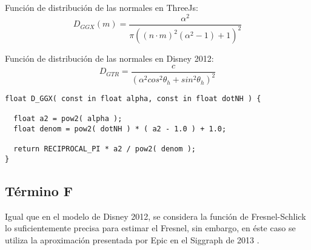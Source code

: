   Funci\'on de distribuci\'on de las normales en ThreeJs:\\

  \begin{equation}
    D_{GGX}(m) = \frac{\alpha^2}{\pi((n\cdotp{m})^2(\alpha^2 - 1 ) + 1)^2}
  \end{equation}
  \singlespacing

  Funci\'on de distribuci\'on de las normales en Disney 2012:\\

  \begin{equation}
    D_{GTR} = \frac
    {c}
    {(\alpha^2 cos^2 \theta_h + sin^2 \theta_h)^2}
  \end{equation}
  \singlespacing

  \begin{lstlisting}[caption=Implementaci\'on en ThreeJs del t\'ermino de geometr\'ia]
float D_GGX( const in float alpha, const in float dotNH ) {

  float a2 = pow2( alpha );
  float denom = pow2( dotNH ) * ( a2 - 1.0 ) + 1.0;

  return RECIPROCAL_PI * a2 / pow2( denom );
}
  \end{lstlisting}
  \singlespacing

  \subsection*{T\'ermino F}
  Igual que en el modelo de Disney 2012, se considera la funci\'on de Fresnel-Schlick lo suficientemente precisa para
  estimar el Fresnel, sin embargo, en \'este caso se utiliza la aproximaci\'on presentada por Epic en el Siggraph de 2013 \autocite{unreal}.\\

